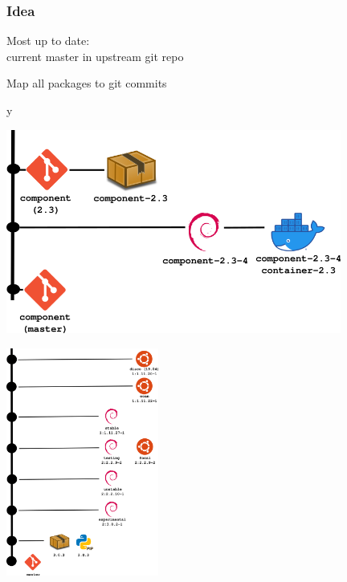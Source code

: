 \documentclass[17pt,aspectratio=169,hyperref={pdfusetitle,colorlinks,allcolors=olive}]{beamer}
\begin{document}
\begin{frame}[fragile]
  \frametitle{Idea}

  {\Large Most up to date:} \\
    current master in upstream git repo \\

    \vspace{1cm}
    
    Map all packages to git commits \\
    
\end{frame}

\begin{frame}[fragile]
  
y  \begin{center}
  \includegraphics[width=11cm]{figs/component-pkgs-diff}
  \end{center}
    
\end{frame}

\begin{frame}[fragile]
  
  \begin{center}
  \includegraphics[height=7.5cm]{figs/django-versions}
  \end{center}
    
\end{frame}
\end{document}
